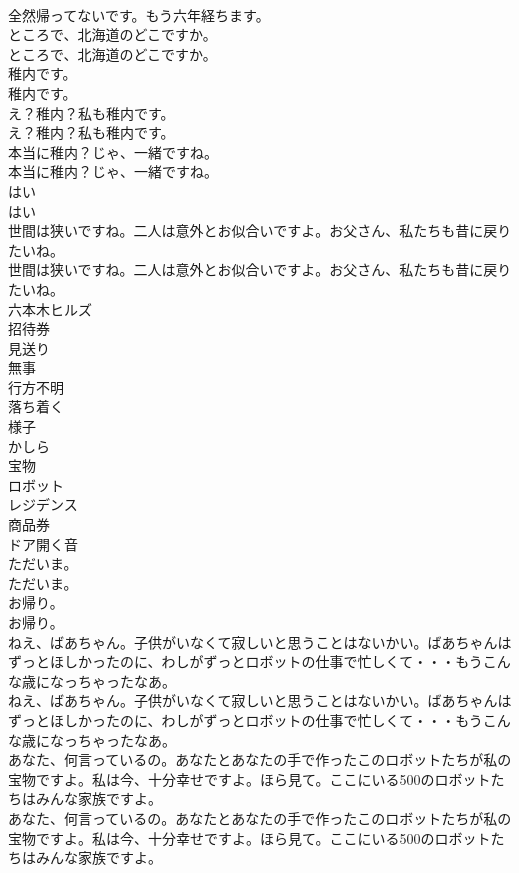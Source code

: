 \documentclass[8pt]{extreport}
\begin{document}
\begin{CJK}{UTF8}{min}
\\	全然帰ってないです。もう六年経ちます。 
\\	ところで、北海道のどこですか。	
\\	ところで、北海道のどこですか。 
\\	稚内です。	
\\	稚内です。 
\\	え？稚内？私も稚内です。	
\\	え？稚内？私も稚内です。 
\\	本当に稚内？じゃ、一緒ですね。	
\\	本当に稚内？じゃ、一緒ですね。 
\\	はい	
\\	はい 
\\	世間は狭いですね。二人は意外とお似合いですよ。お父さん、私たちも昔に戻りたいね。	
\\	世間は狭いですね。二人は意外とお似合いですよ。お父さん、私たちも昔に戻りたいね。 
\\	六本木ヒルズ
\\	招待券
\\	見送り
\\	無事
\\	行方不明
\\	落ち着く
\\	様子
\\	かしら
\\	宝物
\\	ロボット
\\	レジデンス
\\	商品券
\\	ドア開く音
\\	ただいま。	
\\	ただいま。 
\\	お帰り。	
\\	お帰り。 
\\	ねえ、ばあちゃん。子供がいなくて寂しいと思うことはないかい。ばあちゃんはずっとほしかったのに、わしがずっとロボットの仕事で忙しくて・・・もうこんな歳になっちゃったなあ。	
\\	ねえ、ばあちゃん。子供がいなくて寂しいと思うことはないかい。ばあちゃんはずっとほしかったのに、わしがずっとロボットの仕事で忙しくて・・・もうこんな歳になっちゃったなあ。 
\\	あなた、何言っているの。あなたとあなたの手で作ったこのロボットたちが私の宝物ですよ。私は今、十分幸せですよ。ほら見て。ここにいる500のロボットたちはみんな家族ですよ。	
\\	あなた、何言っているの。あなたとあなたの手で作ったこのロボットたちが私の宝物ですよ。私は今、十分幸せですよ。ほら見て。ここにいる500のロボットたちはみんな家族ですよ。 

\end{CJK}
\end{document}
